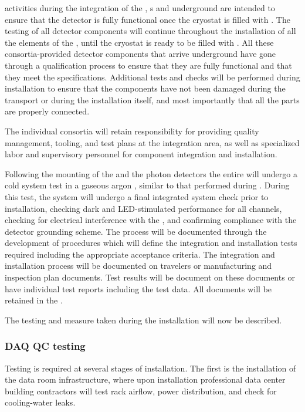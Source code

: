  activities during the integration of the , s and  underground are intended to ensure that the detector is fully functional once the cryostat is filled with . 
The testing of all detector components will continue throughout the installation of all the elements of the , until the cryostat is ready to be filled with .  All these consortia-provided detector components that arrive underground have gone through a qualification process to ensure that they are fully functional and that they meet the  specifications. Additional tests and checks will be performed during installation  to ensure that the components have not been damaged during the transport or during the installation itself, and most importantly that all the parts are properly connected.

The individual consortia will retain responsibility for providing quality management, tooling, and test plans at the integration area, as well as specialized labor and supervisory personnel for component integration and installation.

Following the mounting of the   and the photon detectors the entire  will undergo a cold system test in a gaseous argon \coldbox, similar to that performed during . During this test, the system will undergo a final integrated system check prior to installation, checking dark and LED-stimulated  performance for all channels, checking for electrical interference with the , and confirming compliance with the detector grounding scheme.
The  process will be documented through the development of procedures which will define the integration and installation tests required including the appropriate acceptance criteria. 
The integration and installation process will be documented on travelers or manufacturing and inspection plan documents. 
Test results will be document on these documents or have individual test reports including the test data. 
All documents will be retained in the .

The testing and  measure taken during the installation will now be described.


\subsubsection{DAQ QC testing}

Testing is required at several stages of  installation.  The first is the installation of the data room infrastructure, where upon installation professional data center building contractors will test rack airflow, power distribution, and check for cooling-water leaks.

